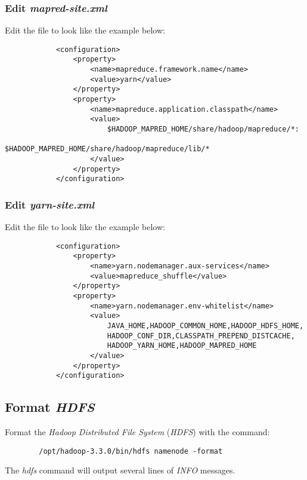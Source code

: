\documentclass{article}
\begin{document}
        \subsubsection{Edit \emph{mapred-site.xml}}
        Edit the file  to look like the example below:
        \begin{verbatim}
            <configuration>
                <property>
                    <name>mapreduce.framework.name</name>
                    <value>yarn</value>
                </property>
                <property>
                    <name>mapreduce.application.classpath</name>
                    <value>
                        $HADOOP_MAPRED_HOME/share/hadoop/mapreduce/*:
                        $HADOOP_MAPRED_HOME/share/hadoop/mapreduce/lib/*
                    </value>
                </property>
            </configuration>
        \end{verbatim}
        
        \subsubsection{Edit \emph{yarn-site.xml}}
        Edit the file  to look like the example below:
        \begin{verbatim}
            <configuration>
                <property>
                    <name>yarn.nodemanager.aux-services</name>
                    <value>mapreduce_shuffle</value>
                </property>
                <property>
                    <name>yarn.nodemanager.env-whitelist</name>
                    <value>
                        JAVA_HOME,HADOOP_COMMON_HOME,HADOOP_HDFS_HOME,
                        HADOOP_CONF_DIR,CLASSPATH_PREPEND_DISTCACHE,
                        HADOOP_YARN_HOME,HADOOP_MAPRED_HOME
                    </value>
                </property>
            </configuration>
        \end{verbatim}

    \subsection{Format \emph{HDFS}}
    Format the \emph{Hadoop Distributed File System} (\emph{HDFS}) with the command:
    \begin{verbatim}
        /opt/hadoop-3.3.0/bin/hdfs namenode -format
    \end{verbatim}
    The \emph{hdfs} command will output several lines of \emph{INFO} messages.
\end{document}
